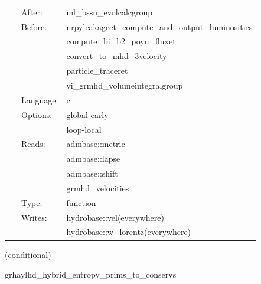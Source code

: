  \begin{tabular*}{160mm}{cll} 
~ & After:  & ml\_bssn\_evolcalcgroup \\ 
~ & Before:  & nrpyleakageet\_compute\_and\_output\_luminosities \\ 
~& ~ &compute\_bi\_b2\_poyn\_fluxet\\ 
~& ~ &convert\_to\_mhd\_3velocity\\ 
~& ~ &particle\_traceret\\ 
~& ~ &vi\_grmhd\_volumeintegralgroup\\ 
~ & Language:  & c \\ 
~ & Options:  & global-early \\ 
~& ~ &loop-local\\ 
~ & Reads:  & admbase::metric \\ 
~& ~ &admbase::lapse\\ 
~& ~ &admbase::shift\\ 
~& ~ &grmhd\_velocities\\ 
~ & Type:  & function \\ 
~ & Writes:  & hydrobase::vel(everywhere) \\ 
~& ~ &hydrobase::w\_lorentz(everywhere)\\ 
\end{tabular*} 


\vspace{5mm}

   (conditional) 

\hspace{5mm} grhaylhd\_hybrid\_entropy\_prims\_to\_conservs 

\hspace{5mm}{\it entropy+hybrid version of grhaylhd\_prims\_to\_conservs } 


\hspace{5mm}

